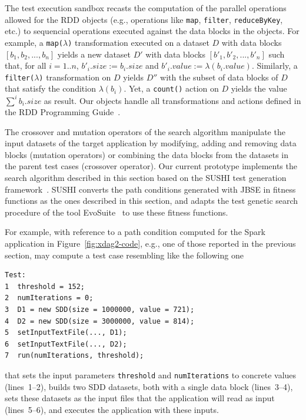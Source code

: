 The test execution sandbox recasts the computation of the parallel operations allowed for the RDD objects (e.g., operations like \texttt{map}, \texttt{filter}, \texttt{reduceByKey}, etc.) to sequencial operations executed against the data blocks in the \sparsedata objects. For example, a  \texttt{map($\lambda$)} transformation executed on a \sparsedata dataset $D$ with data blocks $[b_1, b_2, ..., b_n]$ yields a new \sparsedata dataset $D'$ with data blocks $[b'_1, b'_2, ..., b'_n]$  such that, for all $i=1..n$,  $b'_i.size := b_i.size$ and $b'_i.value := \lambda(b_i.value)$.
Similarly, a  \texttt{filter($\lambda$)} transformation on $D$ 
yields $D''$ with the subset of data blocks of $D$ that satisfy the condition $\lambda(b_i)$. Yet, a \texttt{count()} action on $D$ yields the value $\sum^i b_i.size$ as result. Our \sparsedata objects handle all transformations and actions defined in the RDD Programming Guide~\cite{RDDGuide:online:2019}. 


The crossover and mutation operators of the \approach search algorithm manipulate the input \sparsedata datasets of the target application by modifying, adding and removing data blocks (mutation operators) or combining the data blocks from the \sparsedata datasets in the parent test cases (crossover operator). 
Our current \approach prototype implements the search algorithm described in this section based on the SUSHI test generation framework~\cite{braione:combining:issta:2017, braione:sushi:icse:2018}. SUSHI converts the path conditions generated with JBSE in fitness functions as the ones described in this section, and adapts the test genetic search procedure of the tool EvoSuite~\cite{fraser:evosuite:tse:2013} to use these fitness functions. 

For example, with reference to a path condition computed for the Spark application in Figure~\ref{fig:xdag2-code}, e.g., one of those reported in the previous section, \approach may compute a test case resembling like the following one
\begin{verbatim}
Test:
1  threshold = 152;
2  numIterations = 0;
3  D1 = new SDD(size = 1000000, value = 721);
4  D2 = new SDD(size = 3000000, value = 814);
5  setInputTextFile(..., D1);
6  setInputTextFile(..., D2);
7  run(numIterations, threshold);
\end{verbatim}
that sets the input parameters \texttt{threshold}  and \texttt{numIterations} to concrete values (lines~1--2), builds two SDD datasets, both with a single data block (lines~3--4), sets these datasets as the input files that the application will read as input (lines~5--6), and executes the application with these inputs. 

